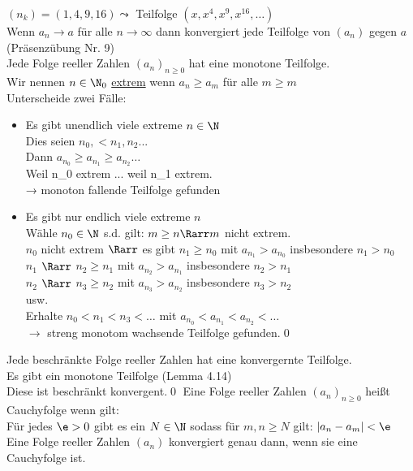 $(n_k) = (1, 4, 9, 16) \leadsto $ Teilfolge $(x, x^4, x^9, x^{16} ,…)$\\
Wenn $a_n \to a$ für alle $n \to \infty$ dann konvergiert jede Teilfolge von $(a_n)$ gegen $a$ (Präsenzübung Nr. 9)\\
%
Jede Folge reeller Zahlen $(a_n)_{n\geq 0}$ hat eine monotone Teilfolge.\\
%
\bew
Wir nennen $n\in \N_0$ \underline{extrem} wenn $a_n \geq a_m$ für alle $m \geq m$\\
Unterscheide zwei Fälle:\\
\begin{itemize}
    \item{Es gibt unendlich viele extreme $n \in \N$\\
Dies seien $n_0, < n_1, n_2...$\\
Dann $a_{n_0} \geq a_{n_1} \geq a_{n_2} …$\\
Weil n_0 extrem ... weil n_1 extrem.\\
→ monoton fallende Teilfolge gefunden}
    \item{Es gibt nur endlich viele extreme $n$\\
Wähle $n_0 \in \N$ s.d. gilt: $m \geq n \Rarr m$ nicht extrem.\\
$n_0$ nicht extrem $\Rarr$ es gibt $n_1 \geq n_0$ mit $a_{n_1} > a_{n_0}$ insbesondere $n_1 > n_0$\\
$n_1$ \phantom{nicht extrem }$\Rarr$ \phantom{es gibt }$n_2 \geq n_1$ mit $a_{n_2} > a_{n_1}$ insbesondere $n_2 > n_1$\\
$n_2$ \phantom{nicht extrem }$\Rarr$ \phantom{es gibt }$n_3 \geq n_2$ mit $a_{n_3} > a_{n_2}$ insbesondere $n_3 > n_2$\\
usw.\\
Erhalte $n_0 < n_1 < n_3 < …$ mit $a_{n_0} < a_{n_1} < a_{n_2} < …$ \\
$\to $ streng monotom wachsende Teilfolge gefunden.\qed
}
\end{itemize}
Jede beschränkte Folge reeller Zahlen hat eine konvergernte Teilfolge.\\
\bew
Es gibt ein monotone Teilfolge (Lemma 4.14)\\
Diese ist beschränkt \Rarr konvergent.\qed
{}
Eine Folge reeller Zahlen $(a_n)_{n \geq 0}$ heißt Cauchyfolge wenn gilt:\\
Für jedes $\e > 0$ gibt es ein $N \in \N$ sodass für $m, n \geq N$ gilt: $|a_n - a_m| < \e$
Eine Folge reeller Zahlen $(a_n)$ konvergiert genau dann, wenn sie eine Cauchyfolge ist.\\
